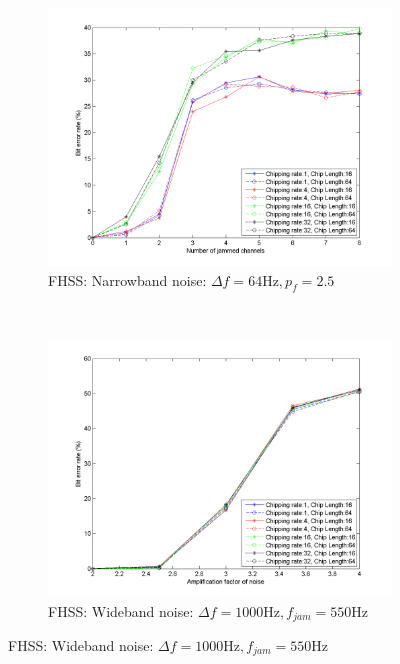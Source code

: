 			\begin{figure}[H]
				\centering
				\caption{}
				\begin{subfigure}[b]{0.5\textwidth}
					\includegraphics[width=\textwidth]{imgs/results/plot_mode_fhss-test_narrowband-rep_20-dataRate_8-dataLength_128.png}
					\caption{FHSS: Narrowband noise: $\Delta f= 64 \text{Hz}, p_f = 2.5$}
					\label{fig:fhss_narrowband}
				\end{subfigure}%
				~
				\begin{subfigure}[b]{0.5\textwidth}
					\includegraphics[width=\textwidth]{imgs/results/plot_mode_fhss-test_wideband-rep_20-dataRate_8-dataLength_128.png}
					\caption{FHSS: Wideband noise: $\Delta f= 1000 \text{Hz}, f_{jam} = 550\text{Hz}$}
					\label{fig:fhss_wideband}
				\end{subfigure}
			\end{figure}
			
